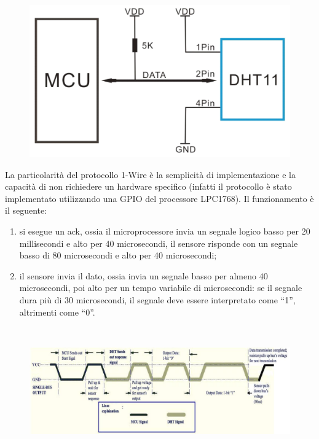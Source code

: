 \documentclass[a4paper,titlepage]{book}
\begin{document}
\begin{figure}[!h]
\centering
\includegraphics[scale=0.6]{DHT11_collegamento.png}
\end{figure}


La particolarità del protocollo 1-Wire è la semplicità di implementazione e la capacità di non richiedere un hardware specifico (infatti il protocollo è stato implementato utilizzando una GPIO del processore LPC1768). Il funzionamento è il seguente: 

\begin{enumerate}

\item si esegue un ack, ossia il microprocessore invia un segnale logico basso per 20 millisecondi e alto per 40 microsecondi, il sensore risponde con un segnale basso di 80 microsecondi e alto per 40 microsecondi;

\item il sensore invia il dato, ossia invia un segnale basso per almeno 40 microsecondi, poi alto per un tempo variabile di microsecondi: se il segnale dura più di 30 microsecondi, il segnale deve essere interpretato come ``1'', altrimenti come ``0''.

\end{enumerate}

~

\begin{figure}[!h]
\centering
\includegraphics[scale=1]{1wire.png}
\end{figure}
\end{document}
